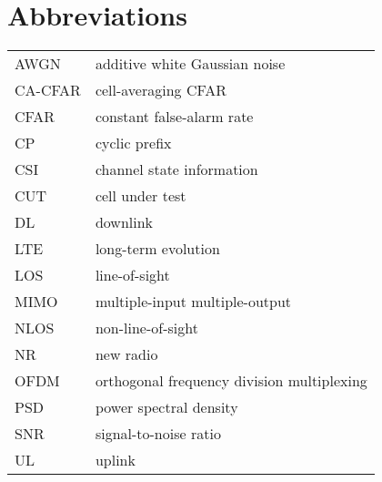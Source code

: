 \chapter*{Abbreviations} %

\begin{table}[H]
    \begin{tabular}{ll}
    	AWGN & additive white Gaussian noise \\[2px]
    	CA-CFAR & cell-averaging CFAR \\[2px]
    	CFAR & constant false-alarm rate \\[2px]
    	CP & cyclic prefix \\[2px]
    	CSI & channel state information \\[2px]
    	CUT & cell under test \\[2px]
    	DL & downlink \\[2px]
        LTE & long-term evolution \\[2px]
        LOS & line-of-sight \\[2px]
        MIMO & multiple-input multiple-output \\[2px]
        NLOS & non-line-of-sight \\[2px]
        NR & new radio\\[2px]
        OFDM & orthogonal frequency division multiplexing \\[2px]
        PSD & power spectral density  \\[2px]
        SNR & signal-to-noise ratio \\[2px]
        UL & uplink \\[2px]
        
        
    \end{tabular}
\end{table}